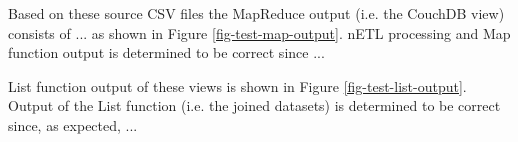 Based on these source CSV files the MapReduce output (i.e. the CouchDB view) consists of ... as shown in Figure \ref{fig-test-map-output}. nETL processing and Map function output is determined to be correct since ...

List function output of these views is shown in Figure \ref{fig-test-list-output}. Output of the List function (i.e. the joined datasets) is determined to be correct since, as expected, ...

\newpage

\newpage

\newpage